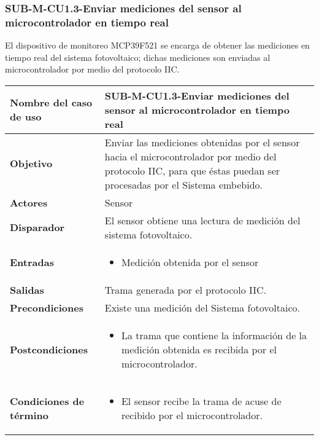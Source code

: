 
\subsubsection{SUB-M-CU1.3-Enviar mediciones del sensor al microcontrolador en tiempo real}\label{SUB-M-CU1.3}
El dispositivo de monitoreo MCP39F521 se encarga de obtener las mediciones en tiempo real del sistema fotovoltaico; dichas mediciones son enviadas al microcontrolador por medio del protocolo IIC.
\begin{longtable}{|J{5cm}|J{10.3cm}|}
	\hline
	\textbf{Nombre del caso de uso} &
		SUB-M-CU1.3-Enviar mediciones del sensor al microcontrolador en tiempo real \\ \hline
	\textbf{Objetivo} &
		Enviar las mediciones obtenidas por el sensor hacia el microcontrolador por medio del protocolo IIC, para que éstas puedan ser procesadas por el Sistema embebido. \\ \hline
	\textbf{Actores} &
		Sensor \\ \hline 
	\textbf{Disparador} & 
		El sensor obtiene una lectura de medición del sistema fotovoltaico. \\ \hline 
	\textbf{Entradas} & 
		\begin{itemize}
				\item Medición obtenida por el sensor
		\end{itemize}\\ \hline 
	\textbf{Salidas} & Trama generada por el protocolo IIC.
		\\ \hline
	\textbf{Precondiciones} & 
		Existe una medición del Sistema fotovoltaico.\\ \hline
	\textbf{Postcondiciones} &
		\begin{itemize}
			\item La trama que contiene la información de la medición obtenida es recibida por el microcontrolador.
		\end{itemize} \\ \hline
	\textbf{Condiciones de término} & 
		\begin{itemize}
			\item El sensor recibe la trama de acuse de recibido por el microcontrolador.
		\end{itemize} 
		\\ \hline 

\end{longtable}
